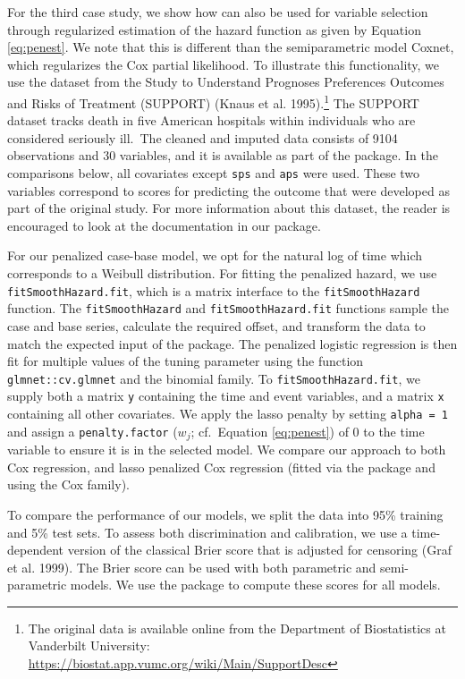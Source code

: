 For the third case study, we show how  can also be used for variable selection through regularized estimation of the hazard function as given by Equation \eqref{eq:penest}. We note that this is different than the semiparametric model Coxnet, which regularizes the Cox partial likelihood. To illustrate this functionality, we use the dataset from the Study to Understand Prognoses Preferences Outcomes and Risks of Treatment (SUPPORT) (Knaus et al. 1995).\footnote{The original data is available online from the Department of Biostatistics at Vanderbilt University: \url{https://biostat.app.vumc.org/wiki/Main/SupportDesc}} The SUPPORT dataset tracks death in five American hospitals within individuals who are considered seriously ill.~The cleaned and imputed data consists of 9104 observations and 30 variables, and it is available as part of the  package. In the comparisons below, all covariates except \texttt{sps} and \texttt{aps} were used. These two variables correspond to scores for predicting the outcome that were developed as part of the original study. For more information about this dataset, the reader is encouraged to look at the documentation in our package.

For our penalized case-base model, we opt for the natural log of time which corresponds to a Weibull distribution. For fitting the penalized hazard, we use \texttt{fitSmoothHazard.fit}, which is a matrix interface to the \texttt{fitSmoothHazard} function. The \texttt{fitSmoothHazard} and \texttt{fitSmoothHazard.fit} functions sample the case and base series, calculate the required offset, and transform the data to match the expected input of the  package. The penalized logistic regression is then fit for multiple values of the tuning parameter using the function \texttt{glmnet::cv.glmnet} and the binomial family. To \texttt{fitSmoothHazard.fit}, we supply both a matrix \texttt{y} containing the time and event variables, and a matrix \texttt{x} containing all other covariates. We apply the lasso penalty by setting \texttt{alpha\ =\ 1} and assign a \texttt{penalty.factor} (\(w_j\); cf.~Equation \eqref{eq:penest}) of 0 to the time variable to ensure it is in the selected model. We compare our approach to both Cox regression, and lasso penalized Cox regression (fitted via the  package and using the Cox family).

To compare the performance of our models, we split the data into 95\% training and 5\% test sets. To assess both discrimination and calibration, we use a time-dependent version of the classical Brier score that is adjusted for censoring (Graf et al. 1999). The Brier score can be used with both parametric and semi-parametric models. We use the  package to compute these scores for all models.

